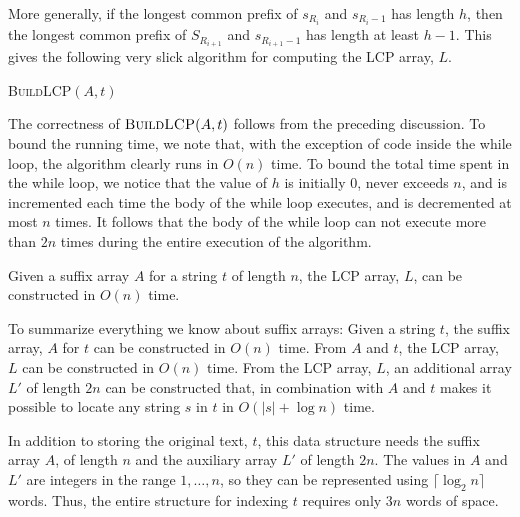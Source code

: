 More generally, if the longest common prefix of $s_{R_i}$ and $s_{R_i-1}$ has length $h$, then the longest common prefix of $S_{R_{i+1}}$ and $s_{R_{i+1}-1}$ has length at least $h-1$.  This gives the following very slick algorithm for computing the LCP array, $L$.

\noindent
\textsc{BuildLCP$(A,t)$}
\begin{algorithmic}
  \ENDFOR
        \ENDWHILE
    \ENDIF
  \ENDFOR
\end{algorithmic}

The correctness of $\textsc{BuildLCP}(A,t)$ follows from the preceding
discussion. To bound the running time, we note that, with the exception of
code inside the while loop, the algorithm clearly runs in $O(n)$ time. To
bound the total time spent in the while loop, we notice that the value of
$h$ is initially 0, never exceeds $n$, and is incremented each time the
body of the while loop executes, and is decremented at most $n$ times.
It follows that the body of the while loop can not execute more than $2n$
times during the entire execution of the algorithm.

\begin{thm}
  Given a suffix array $A$ for a string $t$ of length $n$, the LCP array, 
  $L$, can be constructed in $O(n)$ time.
\end{thm}

To summarize everything we know about suffix arrays:  Given a string $t$,
the suffix array, $A$ for $t$ can be constructed in $O(n)$ time. From
$A$ and $t$, the LCP array, $L$ can be constructed in $O(n)$ time.
From the LCP array, $L$, an additional array $L'$ of length $2n$ can be
constructed that, in combination with $A$ and $t$ makes it possible to
locate any string $s$ in $t$ in $O(|s|+\log n)$ time.

In addition to storing the original text, $t$, this data structure needs
the suffix array $A$, of length $n$ and the auxiliary array $L'$ of length
$2n$. The values in $A$ and $L'$ are integers in the range $1,\ldots,n$,
so they can be represented using $\lceil\log_2 n\rceil$ words.  Thus,
the entire structure for indexing $t$ requires only $3n$ words of space.

